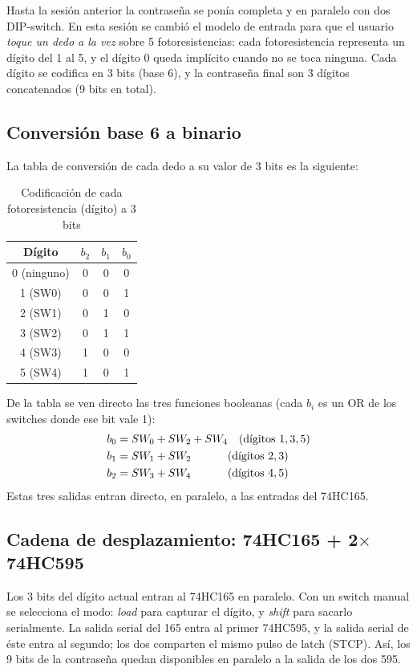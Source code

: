 \documentclass[10pt,conference]{IEEEtran}
\begin{document}
	Hasta la sesi\'on anterior la contrase\~na se pon\'ia completa y en paralelo con dos
	DIP-switch. En esta sesi\'on se cambi\'o el modelo de entrada para que el usuario
	\emph{toque un dedo a la vez} sobre 5 fotoresistencias: cada fotoresistencia representa
	un d\'igito del 1 al 5, y el d\'igito 0 queda impl\'icito cuando no se toca ninguna.
	Cada d\'igito se codifica en 3 bits (base 6), y la contrase\~na final son 3 d\'igitos
	concatenados (9 bits en total).
	
	\subsection{Conversi\'on base 6 a binario}
	La tabla de conversi\'on de cada dedo a su valor de 3 bits es la siguiente:
	\begin{table}[H]
		\centering
		\caption{Codificaci\'on de cada fotoresistencia (d\'igito) a 3 bits}
		\label{tab:base6}
		\begin{tabular}{c|ccc}
			\toprule
			D\'igito & $b_2$ & $b_1$ & $b_0$\\
			\midrule
			0 (ninguno) & 0 & 0 & 0\\
			1 (SW0)     & 0 & 0 & 1\\
			2 (SW1)     & 0 & 1 & 0\\
			3 (SW2)     & 0 & 1 & 1\\
			4 (SW3)     & 1 & 0 & 0\\
			5 (SW4)     & 1 & 0 & 1\\
			\bottomrule
		\end{tabular}
	\end{table}
	
	De la tabla se ven directo las tres funciones booleanas (cada $b_i$ es un OR de los
	switches donde ese bit vale 1):
	\begin{align}
		b_0 &= SW_0 + SW_2 + SW_4 \quad (\text{d\'igitos } 1, 3, 5)\notag\\
		b_1 &= SW_1 + SW_2 \quad\quad\quad\; (\text{d\'igitos } 2, 3)\notag\\
		b_2 &= SW_3 + SW_4 \quad\quad\quad\; (\text{d\'igitos } 4, 5)
	\end{align}
	Estas tres salidas entran directo, en paralelo, a las entradas del 74HC165.
	
	\subsection{Cadena de desplazamiento: 74HC165 + 2$\times$74HC595}
	Los 3 bits del d\'igito actual entran al 74HC165 en paralelo. Con un switch manual
	se selecciona el modo: \emph{load} para capturar el d\'igito, y \emph{shift} para
	sacarlo serialmente. La salida serial del 165 entra al primer 74HC595, y la salida
	serial de \'este entra al segundo; los dos comparten el mismo pulso de latch (STCP).
	As\'i, los 9 bits de la contrase\~na quedan disponibles en paralelo a la salida de
	los dos 595.
	
\end{document}
